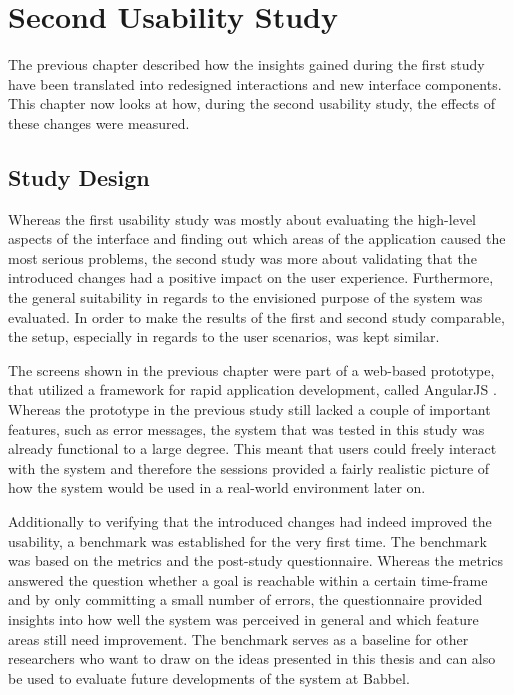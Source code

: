 \chapter{Second Usability Study} \label{chapter:second-iteration}
The previous chapter described how the insights gained during the first study have been translated into redesigned interactions and new interface components. This chapter now looks at how, during the second usability study, the effects of these changes were measured.

\section{Study Design}
Whereas the first usability study was mostly about evaluating the high-level aspects of the interface and finding out which areas of the application caused the most serious problems, the second study was more about validating that the introduced changes had a positive impact on the user experience. Furthermore, the general suitability in regards to the envisioned purpose of the system was evaluated. In order to make the results of the first and second study comparable, the setup, especially in regards to the user scenarios, was kept similar.

The screens shown in the previous chapter were part of a web-based prototype, that utilized a framework for rapid application development, called AngularJS \cite{_angularjs_????}. Whereas the prototype in the previous study still lacked a couple of important features, such as error messages, the system that was tested in this study was already functional to a large degree. This meant that users could freely interact with the system and therefore the sessions provided a fairly realistic picture of how the system would be used in a real-world environment later on.

Additionally to verifying that the introduced changes had indeed improved the usability, a benchmark was established for the very first time. The benchmark was based on the metrics and the post-study questionnaire. Whereas the metrics answered the question whether a goal is reachable within a certain time-frame and by only committing a small number of errors, the questionnaire provided insights into how well the system was perceived in general and which feature areas still need improvement. The benchmark serves as a baseline for other researchers who want to draw on the ideas presented in this thesis and can also be used to evaluate future developments of the system at Babbel.

